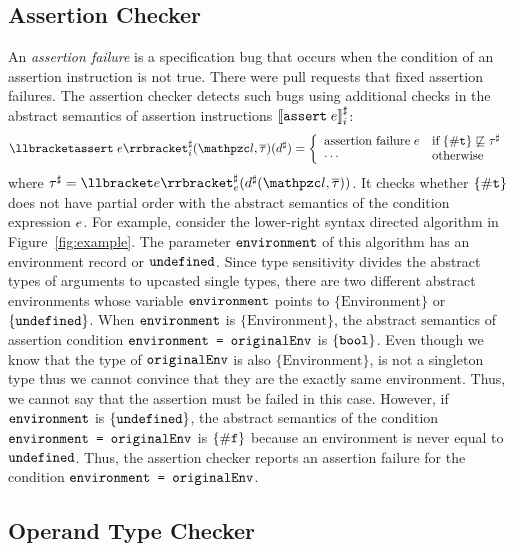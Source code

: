 \subsection{Assertion Checker}
An \textit{assertion failure} is a specification bug that occurs when the
condition of an assertion instruction is not true.  There were  pull
requests that fixed  assertion failures.  The assertion checker
detects such bugs using additional checks in the abstract semantics of assertion
instructions ${\llbracket{\texttt{assert}\; e}\rrbracket}^\sharp_i$:
\[
  \asemi{\kwassert \; \expr}(\lab, \tys)(\aelem) = \left\{
    \begin{array}{ll}
      \text{assertion failure} \; \expr &
      \text{if} \; \{ \true \} \norder \aty\\

      \cdots &
      \text{otherwise}\\
    \end{array}
  \right.\\
\]
where $\aty = \aseme{\expr}(\aelem(\lab, \tys))$.  It checks whether $\{ \mathtt{\#t}
\}$ does not have partial order with the abstract semantics of the condition
expression $e$.  For example, consider the lower-right syntax directed
algorithm in Figure~\ref{fig:example}.  The parameter $\texttt{environment}$ of
this algorithm has an environment record or $\texttt{undefined}$.  Since type sensitivity
divides the abstract types of arguments to upcasted single types, there are two
different abstract environments whose variable $\texttt{environment}$ points to
$\{ \text{Environment} \}$ or $\{ \texttt{undefined} \}$.  When $\texttt{environment}$ is
$\{ \text{Environment} \}$, the abstract semantics of assertion condition
$\texttt{environment = originalEnv}$ is $\{ \texttt{bool} \}$.  Even though we know that
the type of $\texttt{originalEnv}$ is also $\{ \text{Environment} \}$,
 is not a singleton type thus we cannot convince that they are
the exactly same environment.  Thus, we cannot say that the assertion must be
failed in this case.  However, if $\texttt{environment}$ is $\{ \texttt{undefined} \}$, the
abstract semantics of the condition $\texttt{environment = originalEnv}$ is $\{
\mathtt{\#f} \}$ because an environment is never equal to $\texttt{undefined}$.  Thus, the
assertion checker reports an assertion failure for the condition
$\texttt{environment = originalEnv}$.


\subsection{Operand Type Checker}

